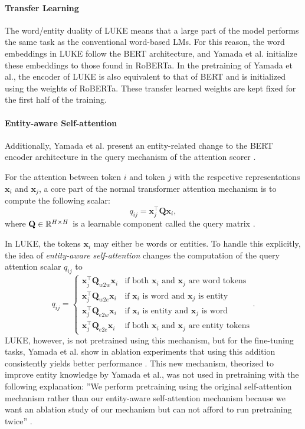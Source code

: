 \documentclass[main.tex]{subfiles}
\begin{document}
\paragraph{Transfer Learning}
The word/entity duality of LUKE means that a large part of the model performs the same task as the conventional word-based LMs.
For this reason, the word embeddings in LUKE follow the BERT architecture, and Yamada et al. initialize these embeddings to those found in RoBERTa.
In the pretraining of Yamada et al., the encoder of LUKE is also equivalent to that of BERT and is initialized using the weights of RoBERTa.
These transfer learned weights are kept fixed for the first half of the training.

\paragraph{Entity-aware Self-attention}
\label{subsubsec:entityaware}
Additionally, Yamada et al. present an entity-related change to the BERT encoder architecture in the query mechanism of the attention scorer \cite[Sec. 3.2]{yamada2020luke}.

For the attention between token $i$ and token $j$ with the respective representations $\mathbf x_i$ and $\mathbf x_j$, a core part of the normal transformer attention mechanism is to compute the following scalar:
\begin{equation}
    q_{ij} = \mathbf x_j^\top \mathbf Q \mathbf x_i,
\end{equation}
where $\mathbf Q\in \mathbb R^{H\times H}$ is a learnable component called the query matrix \cite[Sec. 3.2.1]{vaswani2017att}.

In LUKE, the tokens $\mathbf x_i$ may either be words or entities.
To handle this explicitly, the idea of \emph{entity-aware self-attention} changes the computation of the query attention scalar $q_{ij}$ to
\begin{equation}
    q_{ij} = 
    \begin{cases}
    \mathbf x_j^\top \mathbf Q_{w2w} \mathbf x_i  & \text{if both $\mathbf x_i$ and $\mathbf x_j$ are word tokens}\\
    \mathbf x_j^\top \mathbf Q_{w2e} \mathbf x_i & \text{if $\mathbf x_i$ is word and $\mathbf x_j$ is entity}\\
    \mathbf x_j^\top \mathbf Q_{e2w} \mathbf x_i & \text{if $\mathbf x_i$ is entity and $\mathbf x_j$ is word}\\
    \mathbf x_j^\top \mathbf Q_{e2e} \mathbf x_i & \text{if both $\mathbf x_i$ and $\mathbf x_j$ are entity tokens}
    \end{cases}.
\end{equation}
LUKE, however, is not pretrained using this mechanism, but for the fine-tuning tasks, Yamada et al. show in ablation experiments that using this addition consistently yields better performance \cite[Sec. 5.2]{yamada2020luke}.
This new mechanism, theorized to improve entity knowledge by Yamada et al., was  not used in pretraining with the following explanation:
''We perform pretraining using the original self-attention mechanism rather than our entity-aware self-attention mechanism because we want an ablation study of our mechanism but can not afford to run pretraining twice'' \cite[Sec. 3.4]{yamada2020luke}.
\end{document}
